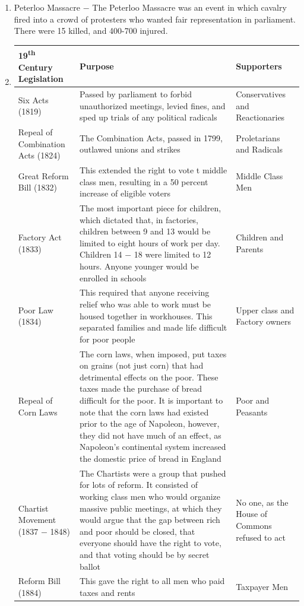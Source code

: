 \documentclass[12pt]{article}
\begin{document}
\begin{enumerate}
\item Peterloo Massacre $-$ The Peterloo Massacre was an event in which cavalry fired into a crowd of protesters who wanted fair representation in parliament. There were 15 killed, and 400-700 injured.

\item \begin{tabular}{p{} p{} p{}}

19\textsuperscript{th} Century Legislation & Purpose & Supporters \\
\hline
Six Acts (1819) & Passed by parliament to forbid unauthorized meetings, levied fines, and sped up trials of any political radicals & Conservatives and Reactionaries \\
\hline
Repeal of Combination Acts (1824) & The Combination Acts, passed in 1799, outlawed unions and strikes & Proletarians and Radicals \\
\hline
Great Reform Bill (1832) & This extended the right to vote t middle class men, resulting in a 50 percent increase of eligible voters  & Middle Class Men \\
\hline
Factory Act (1833) & The most important piece for children, which dictated that, in factories, children between 9 and 13 would be limited to eight hours of work per day. Children 14 $-$ 18 were limited to 12 hours. Anyone younger would be enrolled in schools  & Children and Parents  \\
\hline
Poor Law (1834) & This required that anyone receiving relief who was able to work must be housed together in workhouses. This separated families and made life difficult for poor people  & Upper class and Factory owners  \\
\hline
Repeal of Corn Laws & The corn laws, when imposed, put taxes on grains (not just corn) that had detrimental effects on the poor. These taxes made the purchase of bread difficult for the poor. It is important to note that the corn laws had existed prior to the age of Napoleon, however, they did not have much of an effect, as Napoleon's continental system increased the domestic price of bread in England & Poor and Peasants \\
\hline
Chartist Movement (1837 $-$ 1848) & The Chartists were a group that pushed for lots of reform. It consisted of working class men who would organize massive public meetings, at which they would argue that the gap between rich and poor should be closed, that everyone should have the right to vote, and that voting should be by secret ballot & No one, as the House of Commons refused to act  \\
\hline 
Reform Bill (1884) & This gave the right to all men who paid taxes and rents  & Taxpayer Men  \\
\end{tabular}


\end{enumerate}
\end{document}
